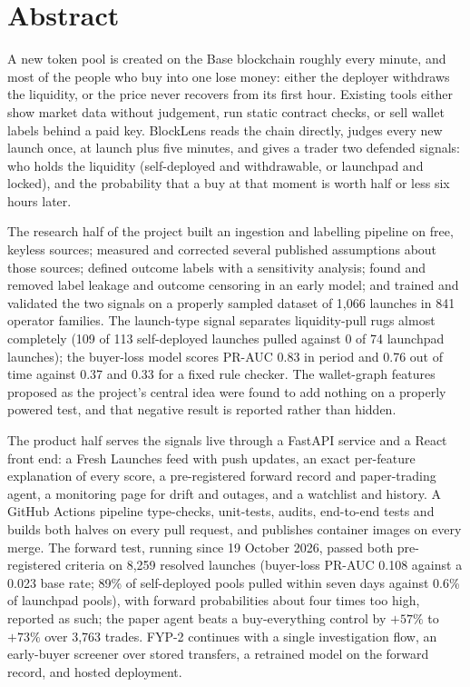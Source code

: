 \chapter*{Abstract}
A new token pool is created on the Base blockchain roughly every minute, and most of the people who buy into one lose money: either the deployer withdraws the liquidity, or the price never recovers from its first hour. Existing tools either show market data without judgement, run static contract checks, or sell wallet labels behind a paid key. BlockLens reads the chain directly, judges every new launch once, at launch plus five minutes, and gives a trader two defended signals: who holds the liquidity (self-deployed and withdrawable, or launchpad and locked), and the probability that a buy at that moment is worth half or less six hours later.

The research half of the project built an ingestion and labelling pipeline on free, keyless sources; measured and corrected several published assumptions about those sources; defined outcome labels with a sensitivity analysis; found and removed label leakage and outcome censoring in an early model; and trained and validated the two signals on a properly sampled dataset of 1,066 launches in 841 operator families. The launch-type signal separates liquidity-pull rugs almost completely (109 of 113 self-deployed launches pulled against 0 of 74 launchpad launches); the buyer-loss model scores PR-AUC 0.83 in period and 0.76 out of time against 0.37 and 0.33 for a fixed rule checker. The wallet-graph features proposed as the project's central idea were found to add nothing on a properly powered test, and that negative result is reported rather than hidden.

The product half serves the signals live through a FastAPI service and a React front end: a Fresh Launches feed with push updates, an exact per-feature explanation of every score, a pre-registered forward record and paper-trading agent, a monitoring page for drift and outages, and a watchlist and history. A GitHub Actions pipeline type-checks, unit-tests, audits, end-to-end tests and builds both halves on every pull request, and publishes container images on every merge. The forward test, running since 19 October 2026, passed both pre-registered criteria on 8,259 resolved launches (buyer-loss PR-AUC 0.108 against a 0.023 base rate; 89\% of self-deployed pools pulled within seven days against 0.6\% of launchpad pools), with forward probabilities about four times too high, reported as such; the paper agent beats a buy-everything control by $+57\%$ to $+73\%$ over 3,763 trades. FYP-2 continues with a single investigation flow, an early-buyer screener over stored transfers, a retrained model on the forward record, and hosted deployment.
